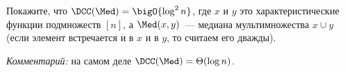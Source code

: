 Покажите, что $\DCC(\Med) = \bigO{\log^2 n}$, где $x$ и $y$ это характеристические функции подмножеств
$[n]$, а $\Med(x, y)$~--- медиана мультимножества $x \cup y$ (если элемент встречается и в $x$ и в $y$,
то считаем его дважды).

\textit{Комментарий:} на самом деле $\DCC(\Med) = \Theta(\log n)$.